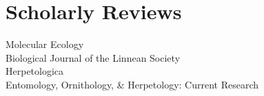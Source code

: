 \documentclass[11pt,a4paper,sans]{moderncv}        %
\begin{document}

\section{Scholarly Reviews}
Molecular Ecology \\
Biological Journal of the Linnean Society \\
Herpetologica \\
Entomology, Ornithology, \& Herpetology: Current Research \\
\end{document}
